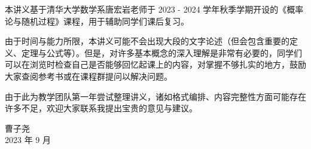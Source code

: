 \documentclass[main.tex]{subfiles}
\begin{document}
本讲义基于清华大学数学系唐宏岩老师于 2023 - 2024 学年秋季学期开设的《概率论与随机过程》课程，用于辅助同学们课后复习。

由于时间与能力所限，本讲义可能不会出现大段的文字论述（但会包含重要的定义、定理与公式等）。但是，对许多基本概念的深入理解是非常有必要的，同学们可以在浏览时检查自己是否能够回忆起课上的内容，对掌握不够扎实的地方，鼓励大家查阅参考书或在课程群提问以解决问题。

由于此为教学团队第一年尝试整理讲义，诸如格式编排、内容完整性方面可能存在许多不足，欢迎大家联系我提出宝贵的意见与建议。

\begin{flushright}
    曹子尧\\
    2023 年 9 月
\end{flushright}
\end{document}
